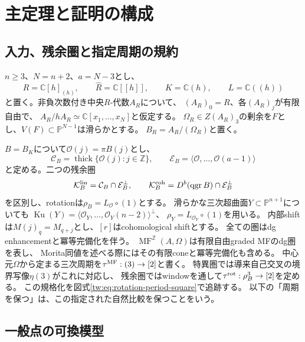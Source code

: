 \section{主定理と証明の構成}\label{gdr:sec:main}

\subsection{入力、残余圏と指定周期の規約}
$n\ge3$、$N=n+2$、$a=N-3$とし、
\[
 R=\mathbb C[h]_{(h)},\qquad \widehat R=\mathbb C[[h]],\qquad
 K=\mathbb C(h),\qquad L=\mathbb C((h))
\]
と置く。非負次数付き中央$R$-代数$A_R$について、
$(A_R)_0=R$、各$(A_R)_j$が有限自由で、
$A_R/hA_R\simeq\mathbb C[x_1,\ldots,x_N]$と仮定する。
$\Omega_R\in Z(A_R)_3$の剰余を$F$とし、$V(F)\subset\mathbb P^{N-1}$は滑らかとする。
$B_R=A_R/(\Omega_R)$と置く。

$B=B_K$について$\mathcal O(j)=\pi B(j)$とし、
\[
 \mathcal C_B=\operatorname{thick}\{\mathcal O(j):j\in\mathbb Z\},\qquad
 \mathcal E_B=\langle\mathcal O,\ldots,\mathcal O(a-1)\rangle
\]
と定める。二つの残余圏
\begin{equation}\label{gdr:eq:residual-defs}
 \mathcal K_B^{\rm lin}=\mathcal C_B\cap\mathcal E_B^\perp,
 \qquad
 \mathcal K_B^{\rm coh}=D^b(\operatorname{qgr}B)\cap\mathcal E_B^\perp
\end{equation}
を区別し、rotationは$\rho_B=L_{\mathcal O}\circ(1)$とする。
滑らかな三次超曲面$Y\subset\mathbb P^{n+1}$についても
$\operatorname{Ku}(Y)=\langle\mathcal O_Y,\ldots,\mathcal O_Y(n-2)\rangle^\perp$、
$\rho_Y=L_{\mathcal O_Y}\circ(1)$を用いる。
内部shiftは$M(j)_q=M_{q+j}$とし、$[r]$はcohomological shiftとする。
全ての圏はdg enhancementと冪等完備化を伴う。
\(\operatorname{MF}^{\mathbb Z}(A,\Omega)\)は有限自由graded MFのdg圏を表し、
Morita同値を述べる際にはその有限coneと冪等完備化も含める。
中心元$\Omega$から定まる三次周期を$\tau^{\rm MF}:(3)\to[2]$と書く。
特異圏では導来自己交叉の境界写像$\eta(3)$がこれに対応し、
残余圏ではwindowを通して$\tau^{\rm rot}:\rho_B^3\to[2]$を定める。
この規格化を図式\eqref{tw:eq:rotation-period-square}で追跡する。
以下の「周期を保つ」は、この指定された自然比較を保つことをいう。

\subsection{一般点の可換模型}

